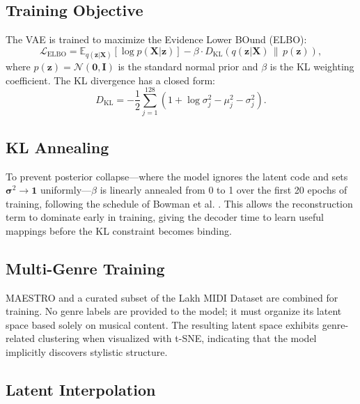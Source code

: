 \documentclass{article}
\begin{document}
\subsection{Training Objective}

The VAE is trained to maximize the Evidence Lower BOund (ELBO):
\begin{equation}
  \mathcal{L}_{\text{ELBO}} = \mathbb{E}_{q(\mathbf{z}|\mathbf{X})}\left[\log p(\mathbf{X}|\mathbf{z})\right] - \beta \cdot D_{\mathrm{KL}}\!\left(q(\mathbf{z}|\mathbf{X}) \,\|\, p(\mathbf{z})\right),
\end{equation}
where $p(\mathbf{z}) = \mathcal{N}(\mathbf{0}, \mathbf{I})$ is the standard normal prior and $\beta$ is the KL weighting coefficient. The KL divergence has a closed form:
\begin{equation}
  D_{\mathrm{KL}} = -\frac{1}{2} \sum_{j=1}^{128} \left(1 + \log \sigma_j^2 - \mu_j^2 - \sigma_j^2\right).
\end{equation}

\subsection{KL Annealing}

To prevent posterior collapse—where the model ignores the latent code and sets $\boldsymbol{\sigma}^2 \to \mathbf{1}$ uniformly—$\beta$ is linearly annealed from 0 to 1 over the first 20 epochs of training, following the schedule of Bowman et al. \cite{bowman2016generating}. This allows the reconstruction term to dominate early in training, giving the decoder time to learn useful mappings before the KL constraint becomes binding.

\subsection{Multi-Genre Training}

MAESTRO and a curated subset of the Lakh MIDI Dataset are combined for training. No genre labels are provided to the model; it must organize its latent space based solely on musical content. The resulting latent space exhibits genre-related clustering when visualized with t-SNE, indicating that the model implicitly discovers stylistic structure.

\subsection{Latent Interpolation}
\end{document}
